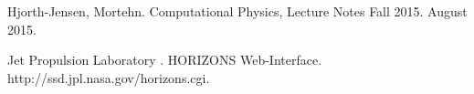 \documentclass[%
oneside,                 %
final,                   %
10pt]{article}
\begin{document}

\begin{thebibliography}{9}

Hjorth-Jensen, Mortehn. 
Computational Physics, Lecture Notes Fall 2015. 
August 2015.

Jet Propulsion Laboratory .
HORIZONS Web-Interface. 
http://ssd.jpl.nasa.gov/horizons.cgi.


\end{thebibliography}



\end{document}
